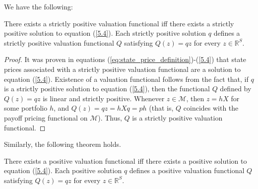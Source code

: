 \documentclass[\topdir/lecture\_notes.tex]{subfiles}
\begin{document}
We have the following:
\begin{theorem}\label{thm:strictly_positive_valuation}
There exists a strictly positive valuation functional iff there exists a strictly positive solution to equation (\ref{5.4}). Each strictly positive solution $q$ defines a strictly positive valuation functional $Q$ satisfying $Q(z)=q z$ for every $z \in \mathbb{R}^{S}$.
\end{theorem}
\begin{proof}
It was proven in equations (\ref{eq:state_price_definition})-(\ref{5.4}) that state prices associated with a strictly positive valuation functional are a solution to equation (\ref{5.4}). Existence of a valuation functional follows from the fact that, if $q$ is a strictly positive solution to equation (\ref{5.4}), then the functional $Q$ defined by $Q(z)=q z$ is linear and strictly positive. Whenever $z \in \mathcal{M}$, then $z=h X$ for some portfolio $h$, and $Q(z)=q z=h X q=p h$ (that is, $Q$ coincides with the payoff pricing functional on $\mathcal{M}$). Thus, $Q$ is a strictly positive valuation functional.
\end{proof}
Similarly, the following theorem holds.
\begin{theorem}\label{thm:positive_valuation}
There exists a positive valuation functional iff there exists a positive solution to equation (\ref{5.4}). Each positive solution $q$ defines a positive valuation functional $Q$ satisfying $Q(z)=q z$ for every $z \in \mathbb{R}^{S}$.
\end{theorem}
\end{document}
